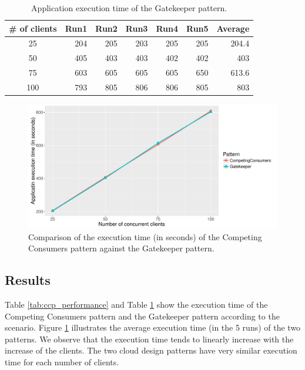 \documentclass{article}
\begin{document}
\begin{table}[!]
    \centering
    \caption{Application execution time of the Gatekeeper pattern.}
    \label{tab:gatekeeper_performance}
    \begin{tabular}{|c|r|r|r|r|r|r|}
        \hline
        \textbf{\# of clients} & \textbf{Run1} & \textbf{Run2} & \textbf{Run3} & \textbf{Run4} & \textbf{Run5} & \textbf{Average}\\ \hline
        25 & 204 & 205 & 203 & 205 & 205 & 204.4 \\ \hline 
        50 & 405 & 403 & 403 & 402 & 402 & 403 \\ \hline
        75 & 603 & 605 & 605 & 605 & 650 & 613.6 \\ \hline
        100 & 793 & 805 & 806 & 806 & 805 & 803 \\ \hline
	\end{tabular}
\end{table}

\begin{figure}[t]
    \centering
        \includegraphics[width = \columnwidth]{images/performance.pdf}
    \caption{Comparison of the execution time (in seconds) of the Competing Consumers pattern against the Gatekeeper pattern.}
    \label{fig:performance}
\end{figure}


\subsection{Results}
Table \ref{tab:ccp_performance} and Table \ref{tab:gatekeeper_performance} show the execution time of the Competing Consumers pattern and the Gatekeeper pattern according to the scenario. Figure \ref{fig:performance} illustrates the average execution time (in the 5 runs) of the two patterns. We observe that the execution time tends to linearly increase with the increase of the clients. The two cloud design patterns have very similar execution time for each number of clients.\\
\end{document}
